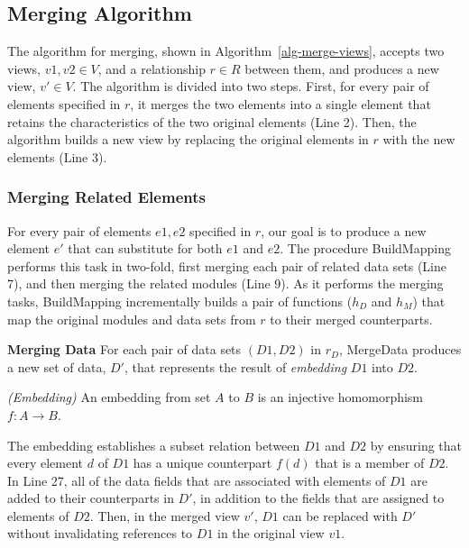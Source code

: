 \subsection{Merging Algorithm}

The algorithm for merging, shown in Algorithm~\ref{alg-merge-views},
accepts two views, $v1, v2 \in V$, and a relationship $r \in R$
between them, and produces a new view, $v' \in V$. The algorithm is
divided into two steps. First, for every pair of elements specified in
$r$, it merges the two elements into a single element that retains the
characteristics of the two original elements (Line 2). Then, the
algorithm builds a new view by replacing the original elements in
$r$ with the new elements (Line 3).


\subsubsection{Merging Related Elements}

For every pair of elements $e1, e2$ specified in $r$, our goal is to
produce a new element $e'$ that can substitute for both $e1$ and
$e2$. The procedure \textsf{BuildMapping} performs this task in
two-fold, first merging each pair of related data sets (Line 7), and
then merging the related modules (Line 9). As it performs the merging tasks,
\textsf{BuildMapping} incrementally builds a pair of functions ($h_{D}$ and
$h_{M}$) that map the original modules and data sets from $r$ to their
merged counterparts.


\textbf{Merging Data} For each pair of data sets $(D1, D2)$ in
$r_{D}$, \textsf{MergeData} produces a new set of data, $D'$,
that represents the result of \textit{embedding} $D1$ into
$D2$. 
\begin{defn} \emph{(Embedding)}
  An embedding from set $A$ to $B$ is an injective homomorphism $f : A
  \rightarrow B$.
\end{defn}
The embedding establishes a subset relation between $D1$ and $D2$ by
ensuring that every element $d$ of $D1$ has a unique counterpart
$f(d)$ that is a member of $D2$. In Line 27, all of the data fields
that are associated with elements of $D1$ are added to their
counterparts in $D'$, in addition to the fields that are assigned to
elements of $D2$. Then, in the merged view $v'$, $D1$ can be replaced
with $D'$ without invalidating references to $D1$ in the original view
$v1$.


